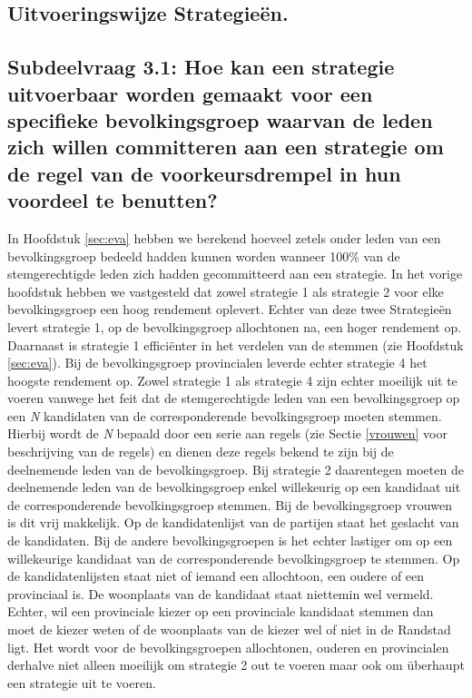 \subsection{Uitvoeringswijze Strategie\"{e}n.}

\subsection*{Subdeelvraag 3.1: Hoe kan een strategie uitvoerbaar worden gemaakt voor een specifieke bevolkingsgroep waarvan de leden zich willen committeren aan een strategie om de regel van de voorkeursdrempel in hun voordeel te benutten?}
In Hoofdstuk \ref{sec:eva} hebben we berekend hoeveel zetels onder leden van een bevolkingsgroep bedeeld hadden kunnen worden wanneer 100\% van de stemgerechtigde leden zich hadden gecommitteerd aan een strategie. In het vorige hoofdstuk hebben we vastgesteld dat zowel strategie 1 als strategie 2 voor elke bevolkingsgroep een hoog rendement oplevert. Echter van deze twee Strategie\"{e}n levert strategie 1, op de bevolkingsgroep allochtonen na, een hoger rendement op. Daarnaast is strategie 1 effici\"{e}nter in het verdelen van de stemmen (zie Hoofdstuk \ref{sec:eva}). Bij de bevolkingsgroep provincialen leverde echter strategie 4 het hoogste rendement op. Zowel strategie 1 als strategie 4 zijn echter moeilijk uit te voeren vanwege het feit dat de stemgerechtigde leden van een bevolkingsgroep op een \textit{N} kandidaten van de corresponderende bevolkingsgroep moeten stemmen. Hierbij wordt de \textit{N} bepaald door een serie aan regels (zie Sectie \ref{vrouwen} voor beschrijving van de regels) en dienen deze regels bekend te zijn bij de deelnemende leden van de bevolkingsgroep. Bij strategie 2 daarentegen moeten de deelnemende leden van de bevolkingsgroep enkel willekeurig op een kandidaat uit de corresponderende bevolkingsgroep stemmen. Bij de bevolkingsgroep vrouwen is dit vrij makkelijk. Op de kandidatenlijst van de partijen staat het geslacht van de kandidaten. Bij de andere bevolkingsgroepen is het echter lastiger om op een willekeurige kandidaat van de corresponderende bevolkingsgroep te stemmen. Op de kandidatenlijsten staat niet of iemand een allochtoon, een oudere of een provinciaal is. De woonplaats van de kandidaat staat niettemin wel vermeld. Echter, wil een provinciale kiezer op een provinciale kandidaat stemmen dan moet de kiezer weten of de woonplaats van de kiezer wel of niet in de Randstad ligt. Het wordt voor de bevolkingsgroepen allochtonen, ouderen en provincialen derhalve niet alleen moeilijk om strategie 2 out te voeren maar ook om \"{u}berhaupt een strategie uit te voeren. 

